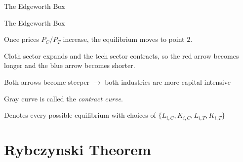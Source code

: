 \documentclass[notes,11pt, aspectratio=169, xcolor=table]{beamer}
\newenvironment{wideitemize}{\itemize\addtolength{\itemsep}{10pt}}{\enditemize}
\begin{document}
\begin{frame}{The Edgeworth Box}

\end{frame}


\begin{frame}{The Edgeworth Box}

\begin{wideitemize}
    \item  Once prices $P_C / P_T$ increase, the equilibrium moves to point $2$.
    \item Cloth sector expands and the tech sector contracts, so the red arrow becomes longer and the blue arrow becomes shorter.
    \item Both arrows become steeper $\rightarrow$ both industries are more capital intensive
    \item Gray curve is called the \textit{contract curve}.
    \item Denotes every possible equilibrium with choices of $\{L_{i,C},K_{i,C},L_{i,T},K_{i,T}\}$
\end{wideitemize}


\end{frame}
\section{Rybczynski Theorem}
\end{document}
